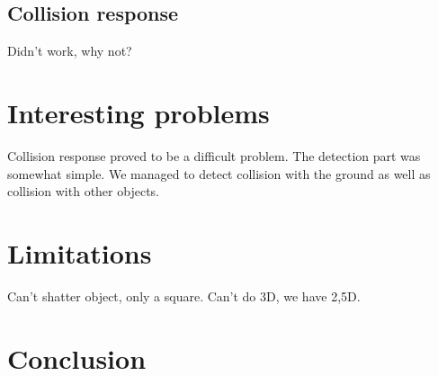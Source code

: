 \documentclass[10pt]{article}
\begin{document}
\subsection{Collision response}
Didn't work, why not?

\section{Interesting problems}
Collision response proved to be a difficult problem. The detection part was somewhat
simple. We managed to detect collision with the ground as well as collision with
other objects.

\section{Limitations}
Can't shatter object, only a square. Can't do 3D, we have 2,5D.

\section{Conclusion}
\end{document}

